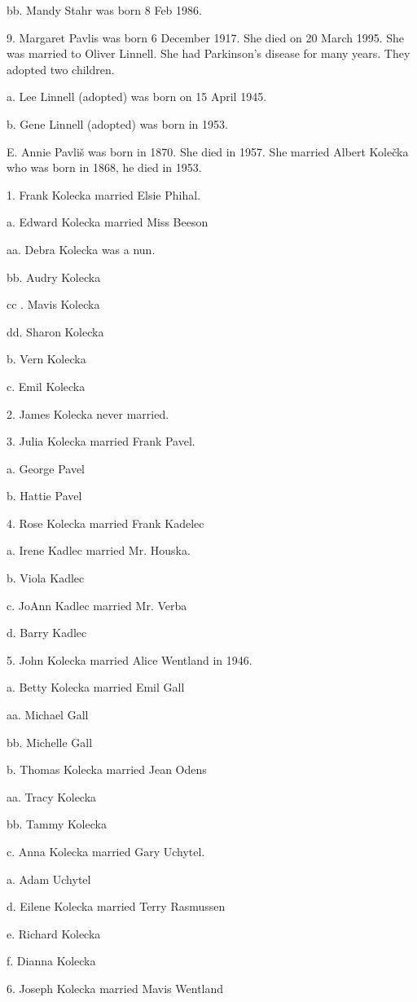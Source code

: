 \documentclass[a4paper]{article}
\begin{document}
bb. Mandy Stahr was born 8 Feb 1986.

9. Margaret Pavlis was born 6 December 1917.  She died on 20 March 1995. She was married to Oliver Linnell.  She had Parkinson's disease for many years. They adopted two children.
			
a. Lee Linnell (adopted) was born on 15 April 1945.

b. Gene Linnell (adopted) was born in 1953.   

E. Annie Pavliš was born in 1870.  She died in 1957.  She married Albert Kolečka who was born in 1868, he died in 1953.

1. Frank Kolecka married Elsie Phihal.

a. Edward Kolecka married Miss Beeson

aa. Debra Kolecka was a nun.

bb. Audry Kolecka

cc . Mavis Kolecka

dd. Sharon Kolecka

b. Vern Kolecka

c. Emil Kolecka 

2. James Kolecka never married.

3. Julia Kolecka married Frank Pavel.

a. George Pavel

b. Hattie Pavel

4. Rose Kolecka married Frank Kadelec

a. Irene Kadlec married Mr. Houska.

b. Viola Kadlec

c. JoAnn Kadlec married Mr. Verba

d. Barry Kadlec

5. John Kolecka married Alice Wentland in 1946.  

a. Betty Kolecka married Emil Gall

aa. Michael Gall

bb. Michelle Gall

b. Thomas Kolecka married Jean Odens

aa. Tracy Kolecka

bb. Tammy Kolecka

c. Anna Kolecka married Gary Uchytel.

a. Adam Uchytel

d. Eilene Kolecka married Terry Rasmussen

e. Richard Kolecka

f. Dianna Kolecka

6. Joseph Kolecka married Mavis Wentland
\end{document}
